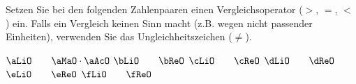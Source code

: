 Setzen Sie bei den folgenden Zahlenpaaren einen Vergleichsoperator ($>$, $=$, $<$) ein. Falls ein Vergleich keinen Sinn macht (z.B. wegen nicht passender Einheiten), verwenden Sie das Ungleichheitszeichen ($\neq$).

\begin{abcliste}
\abc $\aLiO \qquad \aMaO\cdot\aAcO$
\abc $\bLiO \qquad \bReO$
\abc $\cLiO \qquad \cReO$
\abc $\dLiO \qquad \dReO$
\abc $\eLiO \qquad \eReO$
\abc $\fLiO \qquad \fReO$
\end{abcliste}
